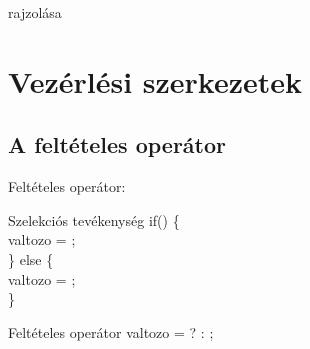 \documentclass[usenames,dvipsnames,aspectratio=169]{beamer}
\begin{document}
\begin{frame}
  \begin{exampleblock}{  rajzolása}
    \vspace{-.2cm}
    
    \vspace{-.2cm}
  \end{exampleblock}
\end{frame}


\section{Vezérlési szerkezetek}
\subsection{A feltételes operátor}
\begin{frame}
  Feltételes operátor: 
  \begin{exampleblock}{Szelekciós tevékenység}
    if() \{\\
    \hspace{0.5cm} valtozo = ;\\
    \} else \{\\
    \hspace{0.5cm} valtozo = ;\\
    \}
  \end{exampleblock}
  \begin{exampleblock}{Feltételes operátor}
    valtozo =  ?  : ;
  \end{exampleblock}
\end{frame}

\begin{frame}
  \begin{exampleblock}{}
    \tiny
    
  \end{exampleblock}
  \begin{columns}[T]
      \begin{exampleblock}{}
        \tiny
        \vspace{-.2cm}
        
        \vspace{-.2cm}
      \end{exampleblock}
      \begin{exampleblock}{}
        \tiny
        \vspace{-.2cm}
        
        \vspace{-.2cm}
      \end{exampleblock}
  \end{columns}
\end{frame}
\end{document}
